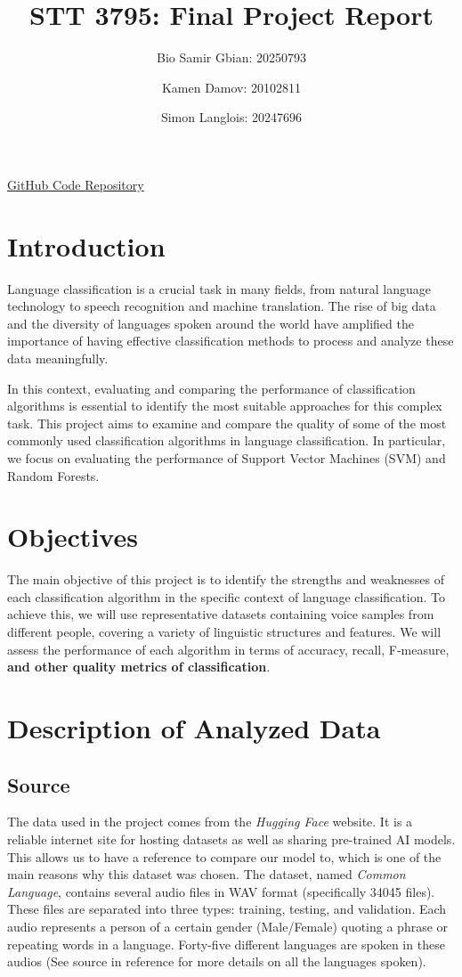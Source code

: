 \documentclass[twocolumn]{article}
\title{STT 3795: Final Project Report}
\author{Bio Samir Gbian: 20250793}
\author{Kamen Damov: 20102811}
\author{Simon Langlois: 20247696}
\affil{Department of Mathematics and Statistics}
\affil{University of Montreal}
\begin{document}
\maketitle

\href{https://github.com/Gonxped31/Projet-STT-3795}{GitHub Code Repository}

\section{Introduction}
Language classification is a crucial task in many fields, from natural language technology to speech recognition and machine translation. The rise of big data and the diversity of languages spoken around the world have amplified the importance of having effective classification methods to process and analyze these data meaningfully.

In this context, evaluating and comparing the performance of classification algorithms is essential to identify the most suitable approaches for this complex task. This project aims to examine and compare the quality of some of the most commonly used classification algorithms in language classification. In particular, we focus on evaluating the performance of Support Vector Machines (SVM) and Random Forests.

\section{Objectives}
The main objective of this project is to identify the strengths and weaknesses of each classification algorithm in the specific context of language classification. To achieve this, we will use representative datasets containing voice samples from different people, covering a variety of linguistic structures and features. We will assess the performance of each algorithm in terms of accuracy, recall, F-measure, \textbf{and other quality metrics of classification}.

\newpage
\section{Description of Analyzed Data}
\subsection{Source}
The data used in the project comes from the \textit{Hugging Face} website. It is a reliable internet site for hosting datasets as well as sharing pre-trained AI models. This allows us to have a reference to compare our model to, which is one of the main reasons why this dataset was chosen.
The dataset, named \textit{Common Language}, contains several audio files in WAV format (specifically 34045 files). These files are separated into three types: training, testing, and validation. Each audio represents a person of a certain gender (Male/Female) quoting a phrase or repeating words in a language. Forty-five different languages are spoken in these audios (See source in reference for more details on all the languages spoken).
\end{document}
